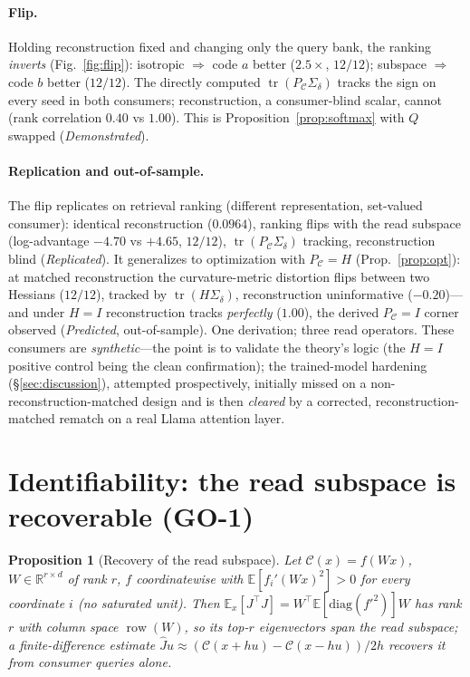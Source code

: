 \documentclass[lettersize,onecolumn]{IEEEtran}
\newtheorem{proposition}{Proposition}
\theoremstyle{definition}
\theoremstyle{remark}
\newcommand{\PC}{P_{\mathcal{C}}}
\newcommand{\Sd}{\Sigma_{\delta}}
\newcommand{\tr}{\operatorname{tr}}
\newcommand{\E}{\mathbb{E}}
\newcommand{\R}{\mathbb{R}}
\begin{document}
\paragraph{Flip.} Holding reconstruction fixed and changing only the query bank, the
ranking \emph{inverts} (Fig.~\ref{fig:flip}): isotropic $\Rightarrow$ code $a$ better ($2.5\times$,
$12/12$); subspace $\Rightarrow$ code $b$ better ($12/12$). The directly computed
$\tr(\PC\Sd)$ tracks the sign on every seed in both consumers; reconstruction, a
consumer-blind scalar, cannot (rank correlation $0.40$ vs $1.00$). This is
Proposition~\ref{prop:softmax} with $Q$ swapped (\emph{Demonstrated}).

\paragraph{Replication and out-of-sample.} The flip replicates on retrieval ranking
(different representation, set-valued consumer): identical reconstruction
($0.0964$), ranking flips with the read subspace (log-advantage $-4.70$ vs $+4.65$,
$12/12$), $\tr(\PC\Sd)$ tracking, reconstruction blind (\emph{Replicated}). It
generalizes to optimization with $\PC=H$ (Prop.~\ref{prop:opt}): at matched
reconstruction the curvature-metric distortion flips between two Hessians ($12/12$),
tracked by $\tr(H\Sd)$, reconstruction uninformative ($-0.20$)---and under $H=I$
reconstruction tracks \emph{perfectly} ($1.00$), the derived $\PC=I$ corner observed
(\emph{Predicted}, out-of-sample). One derivation; three read operators. These
consumers are \emph{synthetic}---the point is to validate the theory's logic (the
$H=I$ positive control being the clean confirmation); the trained-model hardening
(\S\ref{sec:discussion}), attempted prospectively, initially missed on a
non-reconstruction-matched design and is then \emph{cleared} by a corrected,
reconstruction-matched rematch on a real Llama attention layer.

\section{Identifiability: the read subspace is recoverable (GO-1)}\label{sec:id}

\begin{proposition}[Recovery of the read subspace]\label{prop:id}
Let $\mathcal{C}(x)=f(Wx)$, $W\in\R^{r\times d}$ of rank $r$, $f$ coordinatewise with
$\E[f_i'(Wx)^2]>0$ for every coordinate $i$ (no saturated unit). Then
$\E_x[J^\top J]=W^\top\E[\mathrm{diag}(f'^2)]W$ has rank $r$ with column space
$\operatorname{row}(W)$, so its top-$r$ eigenvectors span the read subspace; a
finite-difference estimate $\hat J u\approx(\mathcal{C}(x{+}hu)-\mathcal{C}(x{-}hu))/2h$
recovers it from consumer queries alone.
\end{proposition}
\end{document}
